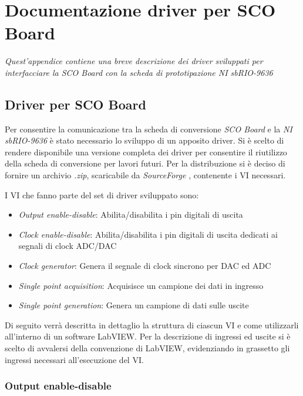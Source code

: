 \chapter{Documentazione driver per SCO Board}
\label{appendiceA}
\thispagestyle{empty}

\textit{Quest'appendice contiene una breve descrizione dei driver sviluppati per interfacciare la SCO Board con la scheda di prototipazione NI sbRIO-9636}

\section*{Driver per SCO Board}
Per consentire la comunicazione tra la scheda di conversione \textit{SCO Board} e la \textit{NI sbRIO-9636} è stato necessario lo sviluppo di un apposito driver. Si è scelto di rendere disponibile una versione completa dei driver per consentire il riutilizzo della scheda di conversione per lavori futuri. 
Per la distribuzione si è deciso di fornire un archivio \textit{.zip}, scaricabile da \textit{SourceForge} \cite{sourceforge}, contenente i VI necessari.

I VI che fanno parte del set di driver sviluppato sono:
\begin{itemize}
	\item \textit{Output enable-disable}: Abilita/disabilita i pin digitali di uscita
	\item \textit{Clock enable-disable}: Abilita/disabilita i pin digitali di uscita dedicati ai segnali di clock ADC/DAC
	\item \textit{Clock generator}: Genera il segnale di clock sincrono per DAC ed ADC
	\item \textit{Single point acquisition}: Acquisisce un campione dei dati in ingresso
	\item \textit{Single point generation}: Genera un campione di dati sulle uscite
\end{itemize}

Di seguito verrà descritta in dettaglio la struttura di ciascun VI e come utilizzarli all'interno di un software LabVIEW.
Per la descrizione di ingressi ed uscite si è scelto di avvalersi della convenzione di LabVIEW, evidenziando in grassetto gli ingressi necessari all'esecuzione del VI.

\subsection*{Output enable-disable}


